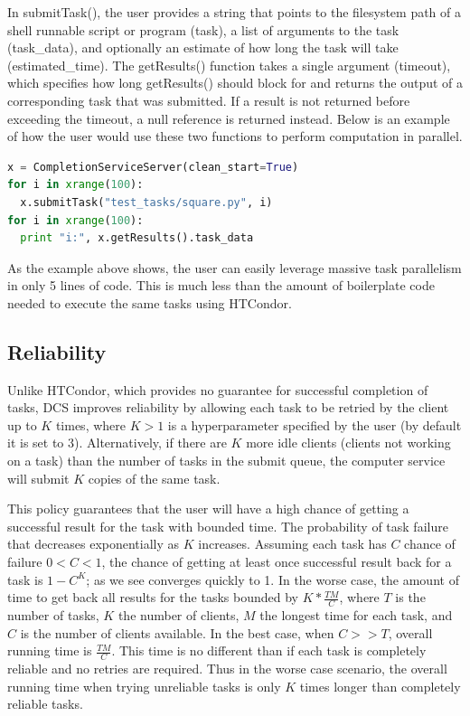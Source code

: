 \documentclass{article}
\begin{document}
In submitTask(), the user provides a string that points to the filesystem path of a shell runnable script or program (task), a list of arguments to the task (task\_data), and optionally an estimate of how long the task will take (estimated\_time). The getResults() function takes a single argument (timeout), which specifies how long getResults() should block for and returns the output of a corresponding task that was submitted. If a result is not returned before exceeding the timeout, a null reference is returned instead. Below is an example of how the user would use these two functions to perform computation in parallel.

\begin{lstlisting}[language=Python]
x = CompletionServiceServer(clean_start=True)
for i in xrange(100):
  x.submitTask("test_tasks/square.py", i)
for i in xrange(100):
  print "i:", x.getResults().task_data
\end{lstlisting}

As the example above shows, the user can easily leverage massive task parallelism in only 5 lines of code. This is much less than the amount of boilerplate code needed to execute the same tasks using HTCondor.

\subsection{Reliability}

Unlike HTCondor, which provides no guarantee for successful completion of tasks, DCS improves reliability by allowing each task to be retried by the client up to $K$ times, where $K>1$ is a hyperparameter specified by the user (by default it is set to 3). Alternatively, if there are $K$ more idle clients (clients not working on a task) than the number of tasks in the submit queue, the computer service will submit $K$ copies of the same task.

This policy guarantees that the user will have a high chance of getting a successful result for the task with bounded time. The probability of task failure that decreases exponentially as $K$ increases. Assuming each task has $C$ chance of failure $0<C<1$, the chance of getting at least once successful result back for a task is $1-C^K$; as we see converges quickly to 1. In the worse case, the amount of time to get back all results for the tasks bounded by $K*\frac{TM}{C}$, where $T$ is the number of tasks, $K$ the number of clients, $M$ the longest time for each task, and $C$ is the number of clients available. In the best case, when $C>>T$, overall running time is $\frac{TM}{C}$. This time is no different than if each task is completely reliable and no retries are required. Thus in the worse case scenario, the overall running time when trying unreliable tasks is only $K$ times longer than completely reliable tasks.
\end{document}
